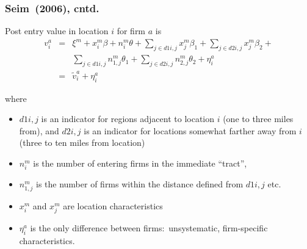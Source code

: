 \begin{frame}%

\frametitle{Seim\ (2006), cntd.}

Post entry value in location $i$ for firm $a$ is 
\begin{eqnarray*}
v_{i}^{a} &=&\xi ^{m}+x_{i}^{m}\beta +n_{i}^{m}\theta +\sum_{j\in
d1i,j}x_{j}^{m}\beta _{1}+\sum_{j\in d2i,j}x_{j}^{m}\beta _{2}+ \\
&&\sum_{j\in d1i,j}n_{1,j}^{m}\theta _{1}+\sum_{j\in d2i,j}n_{2,j}^{m}\theta
_{2}+\eta _{i}^{a} \\
&=&\tilde{v}_{i}^{a}+\eta _{i}^{a}
\end{eqnarray*}

where

\begin{itemize}
\item $d1i,j$ is an indicator for regions adjacent to location $i$ (one to
three miles from), and $d2i,j$ is an indicator for locations somewhat
farther away from $i$ (three to ten miles from location)

\item $n_{i}^{m}$ is the number of entering firms in the immediate
\textquotedblleft tract\textquotedblright ,

\item $n_{1,j}^{m}$ is the number of firms within the distance defined from $%
d1i,j$ etc.

\item $x_{i}^{m}$ and $x_{j}^{m}$ are location characteristics

\item $\eta _{i}^{a}$ is the only difference between firms:\ unsystematic,
firm-specific characteristics.
\end{itemize}

\end{frame}%

